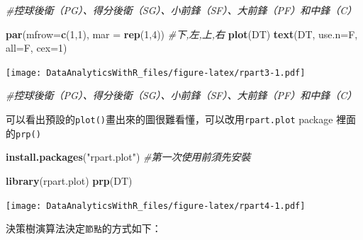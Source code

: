 \documentclass[
]{book}
\newenvironment{Shaded}{\begin{snugshade}}{\end{snugshade}}
\newcommand{\CommentTok}[1]{\textcolor[rgb]{0.56,0.35,0.01}{\textit{#1}}}
\newcommand{\DataTypeTok}[1]{\textcolor[rgb]{0.13,0.29,0.53}{#1}}
\newcommand{\DecValTok}[1]{\textcolor[rgb]{0.00,0.00,0.81}{#1}}
\newcommand{\KeywordTok}[1]{\textcolor[rgb]{0.13,0.29,0.53}{\textbf{#1}}}
\newcommand{\NormalTok}[1]{#1}
\newcommand{\StringTok}[1]{\textcolor[rgb]{0.31,0.60,0.02}{#1}}
\begin{document}
\begin{Shaded}
\begin{Highlighting}[]
\CommentTok{#控球後衛（PG）、得分後衛（SG）、小前鋒（SF）、大前鋒（PF）和中鋒（C）}
\end{Highlighting}
\end{Shaded}

\begin{Shaded}
\begin{Highlighting}[]
\KeywordTok{par}\NormalTok{(}\DataTypeTok{mfrow=}\KeywordTok{c}\NormalTok{(}\DecValTok{1}\NormalTok{,}\DecValTok{1}\NormalTok{), }\DataTypeTok{mar =} \KeywordTok{rep}\NormalTok{(}\DecValTok{1}\NormalTok{,}\DecValTok{4}\NormalTok{)) }\CommentTok{#下,左,上,右}
\KeywordTok{plot}\NormalTok{(DT)}
\KeywordTok{text}\NormalTok{(DT, }\DataTypeTok{use.n=}\NormalTok{F, }\DataTypeTok{all=}\NormalTok{F, }\DataTypeTok{cex=}\DecValTok{1}\NormalTok{)}
\end{Highlighting}
\end{Shaded}

\texttt{[image: DataAnalyticsWithR\_files/figure-latex/rpart3-1.pdf]}

\begin{Shaded}
\begin{Highlighting}[]
\CommentTok{#控球後衛（PG）、得分後衛（SG）、小前鋒（SF）、大前鋒（PF）和中鋒（C）}
\end{Highlighting}
\end{Shaded}

可以看出預設的\texttt{plot()}畫出來的圖很難看懂，可以改用\texttt{rpart.plot} package \citep{R-rpart.plot}裡面的\texttt{prp()}

\begin{Shaded}
\begin{Highlighting}[]
\KeywordTok{install.packages}\NormalTok{(}\StringTok{"rpart.plot"}\NormalTok{) }\CommentTok{#第一次使用前須先安裝}
\end{Highlighting}
\end{Shaded}

\begin{Shaded}
\begin{Highlighting}[]
\KeywordTok{library}\NormalTok{(rpart.plot)}
\KeywordTok{prp}\NormalTok{(DT)	}
\end{Highlighting}
\end{Shaded}

\texttt{[image: DataAnalyticsWithR\_files/figure-latex/rpart4-1.pdf]}

決策樹演算法決定\texttt{節點}的方式如下：
\end{document}
